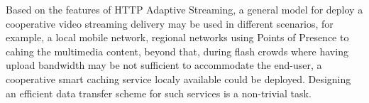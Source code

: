 Based on the features of HTTP Adaptive Streaming, a general model for deploy a cooperative video streaming delivery may be used in different scenarios, for example, a local mobile network, regional networks using Points of Presence to cahing the multimedia content, beyond that, during flash crowds where having upload bandwidth may be not sufficient to accommodate the end-user, a cooperative smart caching service localy available could be deployed.
Designing an efficient data transfer scheme for such services is a non-trivial task.



%
%
%	

